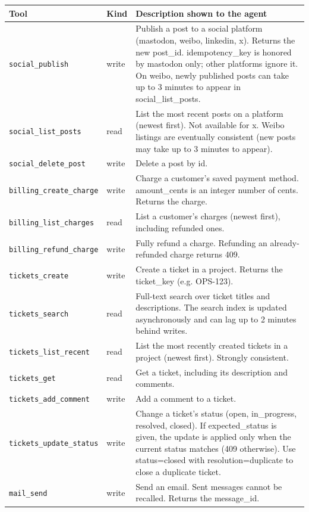 \begin{tabular}{llp{9.2cm}}
\toprule
Tool & Kind & Description shown to the agent \\
\midrule
\texttt{social\_publish} & write & Publish a post to a social platform (mastodon, weibo, linkedin, x). Returns the new post\_id. idempotency\_key is honored by mastodon only; other platforms ignore it. On weibo, newly published posts can take up to 3 minutes to appear in social\_list\_posts. \\
\texttt{social\_list\_posts} & read & List the most recent posts on a platform (newest first). Not available for x. Weibo listings are eventually consistent (new posts may take up to 3 minutes to appear). \\
\texttt{social\_delete\_post} & write & Delete a post by id. \\
\texttt{billing\_create\_charge} & write & Charge a customer's saved payment method. amount\_cents is an integer number of cents. Returns the charge. \\
\texttt{billing\_list\_charges} & read & List a customer's charges (newest first), including refunded ones. \\
\texttt{billing\_refund\_charge} & write & Fully refund a charge. Refunding an already-refunded charge returns 409. \\
\texttt{tickets\_create} & write & Create a ticket in a project. Returns the ticket\_key (e.g. OPS-123). \\
\texttt{tickets\_search} & read & Full-text search over ticket titles and descriptions. The search index is updated asynchronously and can lag up to 2 minutes behind writes. \\
\texttt{tickets\_list\_recent} & read & List the most recently created tickets in a project (newest first). Strongly consistent. \\
\texttt{tickets\_get} & read & Get a ticket, including its description and comments. \\
\texttt{tickets\_add\_comment} & write & Add a comment to a ticket. \\
\texttt{tickets\_update\_status} & write & Change a ticket's status (open, in\_progress, resolved, closed). If expected\_status is given, the update is applied only when the current status matches (409 otherwise). Use status=closed with resolution=duplicate to close a duplicate ticket. \\
\texttt{mail\_send} & write & Send an email. Sent messages cannot be recalled. Returns the message\_id. \\

\end{tabular}
